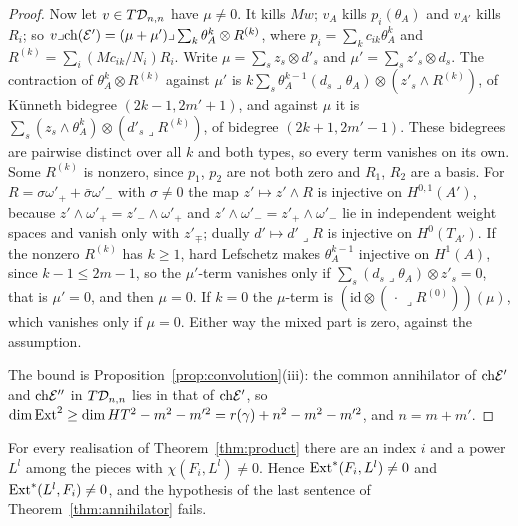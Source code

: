 \begin{proof}
Now let $v\in T\mathcal{D}_{n,n}$ have $\mu\ne0$. It kills $Mw$; $v_{A}$ kills $p_{i}(\theta_{A})$ and $v_{A'}$ kills $R_{i}$; so $v\lrcorner\mathrm{ch}(\mathcal{E}')=(\mu+\mu')\lrcorner\sum_{k}\theta_{A}^{k}\otimes R^{(k)}$, where $p_{i}=\sum_{k}c_{ik}\theta_{A}^{k}$ and $R^{(k)}=\sum_{i}(Mc_{ik}/N_{i})R_{i}$. Write $\mu=\sum_{s}z_{s}\otimes d'_{s}$ and $\mu'=\sum_{s}z'_{s}\otimes d_{s}$. The contraction of $\theta_{A}^{k}\otimes R^{(k)}$ against $\mu'$ is $k\sum_{s}\theta_{A}^{k-1}(d_{s}\lrcorner\theta_{A})\otimes(z'_{s}\wedge R^{(k)})$, of K\"unneth bidegree $(2k-1,2m'+1)$, and against $\mu$ it is $\sum_{s}(z_{s}\wedge\theta_{A}^{k})\otimes(d'_{s}\lrcorner R^{(k)})$, of bidegree $(2k+1,2m'-1)$. These bidegrees are pairwise distinct over all $k$ and both types, so every term vanishes on its own. Some $R^{(k)}$ is nonzero, since $p_{1}$, $p_{2}$ are not both zero and $R_{1}$, $R_{2}$ are a basis. For $R=\sigma\omega'_{+}+\bar\sigma\omega'_{-}$ with $\sigma\ne0$ the map $z'\mapsto z'\wedge R$ is injective on $H^{0,1}(A')$, because $z'\wedge\omega'_{+}=z'_{-}\wedge\omega'_{+}$ and $z'\wedge\omega'_{-}=z'_{+}\wedge\omega'_{-}$ lie in independent weight spaces and vanish only with $z'_{\mp}$; dually $d'\mapsto d'\lrcorner R$ is injective on $H^{0}(T_{A'})$. If the nonzero $R^{(k)}$ has $k\ge1$, hard Lefschetz makes $\theta_{A}^{k-1}$ injective on $H^{1}(A)$, since $k-1\le2m-1$, so the $\mu'$-term vanishes only if $\sum_{s}(d_{s}\lrcorner\theta_{A})\otimes z'_{s}=0$, that is $\mu'=0$, and then $\mu=0$. If $k=0$ the $\mu$-term is $(\mathrm{id}\otimes(\,\cdot\,\lrcorner R^{(0)}))(\mu)$, which vanishes only if $\mu=0$. Either way the mixed part is zero, against the assumption.

The bound is Proposition~\ref{prop:convolution}(iii): the common annihilator of $\mathrm{ch}\mathcal{E}'$ and $\mathrm{ch}\mathcal{E}''$ in $T\mathcal{D}_{n,n}$ lies in that of $\mathrm{ch}\mathcal{E}'$, so $\dim\mathrm{Ext}^{2}\ge\dim HT^{2}-m^{2}-m'^{2}=r(\gamma)+n^{2}-m^{2}-m'^{2}$, and $n=m+m'$.
\end{proof}

\begin{proposition}\label{prop:noorth}
For every realisation of Theorem~\ref{thm:product} there are an index $i$ and a power $L^{l}$ among the pieces with $\chi(F_{i},L^{l})\ne0$. Hence $\mathrm{Ext}^{*}(F_{i},L^{l})\ne0$ and $\mathrm{Ext}^{*}(L^{l},F_{i})\ne0$, and the hypothesis of the last sentence of Theorem~\ref{thm:annihilator} fails.
\end{proposition}

